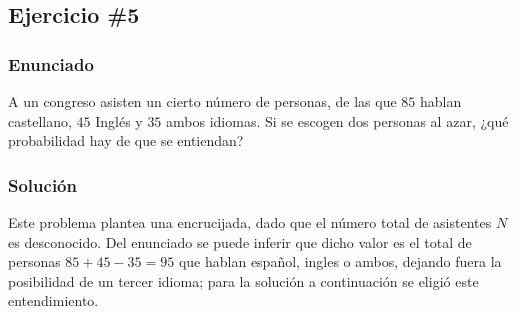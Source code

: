 \documentclass[12pt,a4paper]{article}
\begin{document}
\subsection{Ejercicio \#5}

\subsubsection{Enunciado}

A un congreso asisten un cierto número de personas, de las que \(85\) hablan castellano, \(45\) Inglés y \(35\) ambos idiomas. Si se escogen dos personas al azar, ¿qué probabilidad hay de que se entiendan?

\subsubsection{Solución}

Este problema plantea una encrucijada, dado que el número total de asistentes \(N\) es desconocido. Del enunciado se puede inferir que dicho valor es el total de personas \(85+45-35=95\) que hablan español, ingles o ambos, dejando fuera la posibilidad de un tercer idioma; para la solución a continuación se eligió este entendimiento.
\end{document}
